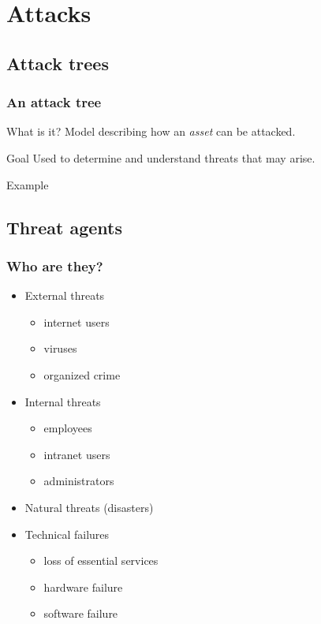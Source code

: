 \section{Attacks}

\begin{frame}
\sectionpage
\end{frame}

\subsection{Attack trees}

\begin{frame}
\frametitle{An attack tree}

\begin{block}{What is it?}
Model describing how an \emph{asset} can be attacked.
\end{block}
\begin{block}{Goal}
Used to determine and understand threats that may arise.
\end{block}
\end{frame}

\begin{frame}{Example}
\end{frame}

\subsection{Threat agents}

\begin{frame}
\frametitle{Who are they?}
\begin{itemize}
\item External threats
	\begin{itemize}
	\item internet users
	\item viruses
	\item organized crime
	\end{itemize}
\item Internal threats
	\begin{itemize}
	\item employees
    \item intranet users
    \item administrators
    \end{itemize}
\item Natural threats (disasters)
\item Technical failures
	\begin{itemize}
	\item loss of essential services
	\item hardware failure
	\item software failure
	\end{itemize}
\end{itemize}
\end{frame}

